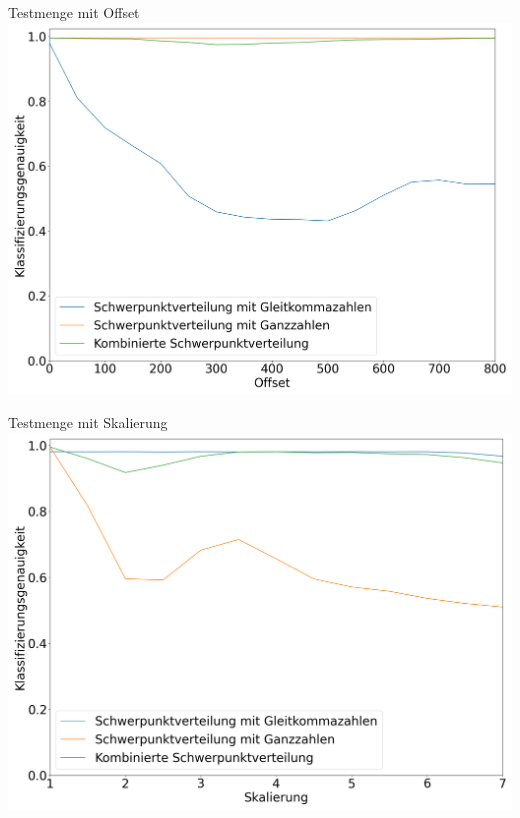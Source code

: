 \documentclass[10pt]{beamer}
\begin{document}
\begin{frame}{Testmenge mit Offset}
    \includegraphics[width=\linewidth]{brightness_offset.png}
\end{frame}

\begin{frame}{Testmenge mit Skalierung}
    \includegraphics[width=\linewidth]{brightness_scaling.png}
\end{frame}
\end{document}
